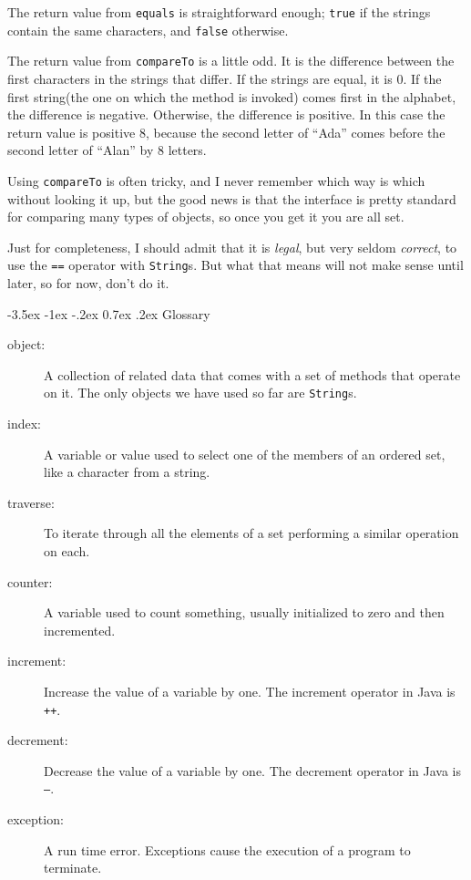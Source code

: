 \documentclass{book}
\makeatletter
\renewcommand{\section}{\@startsection 
    {section} {1} {0mm}%
    {-3.5ex \@plus -1ex \@minus -.2ex}%
    {0.7ex \@plus.2ex}%
    {\normalfont\Large\bfseries}}
\makeatother
\begin{document}
The return value from {\tt equals} is straightforward enough;
{\tt true} if the strings contain the same characters, and
{\tt false} otherwise.

The return value from {\tt compareTo} is a little odd.  It is
the difference between the first characters in the strings
that differ.  If the strings are equal, it is 0.  If the
first string(the one on which the method is invoked) comes
first in the alphabet, the difference is negative.  Otherwise,
the difference is positive.  In this case the return value
is positive 8, because the second letter of ``Ada'' comes
before the second letter of ``Alan'' by 8 letters.

Using {\tt compareTo} is often tricky, and I never remember
which way is which without looking it up, but the good news
is that the interface is pretty standard for comparing many
types of objects, so once you get it you are all set.

Just for completeness, I should admit that it is
{\em legal}, but very seldom {\em correct}, to use the {\tt ==}
operator with {\tt String}s.  But what that means will not make
sense until later, so for now, don't do it.

\section{Glossary}

\begin{description}

\item[object:] A collection of related data that comes with a set of
methods that operate on it.  The only objects we have used so far are
{\tt String}s.

\item[index:]  A variable or value used to select one of the
members of an ordered set, like a character from a string.

\item[traverse:]  To iterate through all the elements of a set
performing a similar operation on each.

\item[counter:]  A variable used to count something, usually
initialized to zero and then incremented.

\item[increment:]  Increase the value of a variable by one.
The increment operator in Java is {\tt ++}.

\item[decrement:]  Decrease the value of a variable by one.
The decrement operator in Java is {\tt --}.

\item[exception:]  A run time error.  Exceptions cause the execution
of a program to terminate.


\end{description}
\end{document}
